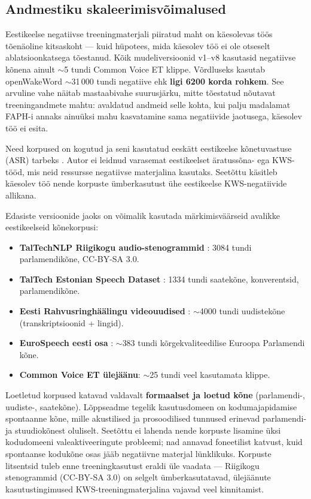 \subsection{Andmestiku skaleerimisvõimalused}

Eestikeelse negatiivse treeningmaterjali piiratud maht on käesolevas töös tõenäoline kitsaskoht --- kuid hüpotees, mida käesolev töö ei ole otseselt ablatsioonkatsega tõestanud. Kõik mudeliversioonid v1--v8 kasutasid negatiivse kõnena ainult $\sim$5 tundi Common Voice ET klippe. Võrdluseks kasutab openWakeWord $\sim$31\,000 tundi negatiive \cite{openwakeword2026, openwakeword-features2024} ehk \textbf{ligi 6200 korda rohkem}. See arvuline vahe näitab mastaabivahe suurusjärku, mitte tõestatud nõutavat treeningandmete mahtu: avaldatud andmeid selle kohta, kui palju madalamat FAPH-i annaks ainuüksi mahu kasvatamine sama negatiivide jaotusega, käesolev töö ei esita.

Need korpused on kogutud ja seni kasutatud eeskätt eestikeelse kõnetuvastuse (ASR) tarbeks \cite{taltech-asr-data2024, riigikogu-stenograms2025}. Autor ei leidnud varasemat eestikeelset äratussõna- ega KWS-tööd, mis neid ressursse negatiivse materjalina kasutaks. Seetõttu käsitleb käesolev töö nende korpuste ümberkasutust ühe eestikeelse KWS-negatiivide allikana.

Edasiste versioonide jaoks on võimalik kasutada märkimisväärseid avalikke eestikeelseid kõnekorpusi:

\begin{itemize}
    \item \textbf{TalTechNLP Riigikogu audio-stenogrammid} \cite{riigikogu-stenograms2025}: 3084 tundi parlamendikõne, CC-BY-SA 3.0.
    \item \textbf{TalTech Estonian Speech Dataset} \cite{taltech-asr-data2024}: 1334 tundi saatekõne, konverentsid, parlamendikõne.
    \item \textbf{Eesti Rahvusringhäälingu videouudised} \cite{err-video-news2025}: $\sim$4000 tundi uudiste\-kõne (transkriptsioonid + lingid).
    \item \textbf{EuroSpeech eesti osa} \cite{eurospeech2024}: $\sim$383 tundi kõrgekvaliteedilise Euroopa Parlamendi kõne.
    \item \textbf{Common Voice ET ülejäänu}: $\sim$25 tundi veel kasutamata klippe.
\end{itemize}

Loetletud korpused katavad valdavalt \textbf{formaalset ja loetud kõne} (parlamendi-, uudiste-, saatekõne). Lõppseadme tegelik kasutusdomeen on kodumajapidamise spontaanne kõne, mille akustilised ja prosoodilised tunnused erinevad parlamendi- ja stuudiokõnest oluliselt. Seetõttu ei lahenda nende korpuste lisamine üksi kodudomeeni valeaktiveeringute probleemi; nad annavad foneetilist katvust, kuid spontaanse kodukõne osas jääb negatiivne materjal lünklikuks. Korpuste litsentsid tuleb enne treeningkasutust eraldi üle vaadata --- Riigikogu stenogrammid (CC-BY-SA 3.0) on selgelt ümberkasutatavad, ülejäänute kasutustingimused KWS-treeningmaterjalina vajavad veel kinnitamist.

